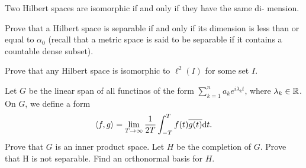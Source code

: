 \documentclass[11pt,a4paper]{article}
\begin{document}

\begin{exercise}
  Two Hilbert spaces are isomorphic if and only if they have the same di-
mension.
\end{exercise}
\begin{solution}

\end{solution}

\begin{exercise}
  Prove that a Hilbert space is separable if and only if its dimension is less
than or equal to $\alpha_0$
(recall that a metric space is said to be separable if it contains a countable
dense subset).
\end{exercise}
\begin{solution}

\end{solution}

\begin{exercise}
  Prove that any Hilbert space is isomorphic to $\ell^2(I)$ for some set $I$.
\end{exercise}
\begin{solution}

\end{solution}

\begin{exercise}
  Let $G$ be the linear span of all functinos of the form
  $\sum_{k=1}^{n} a_k e^{i \lambda_k t}$, where $\lambda_k \in \mathbb{R}$.
  On $G$, we define a form
  \[
    \left\langle f, g \right\rangle =
    \lim_{T \to \infty} \frac{1}{2T} \int_{-T}^{T} f(t) \overline{g(t)} \mathrm{d} t.
  \]
  Prove that $G$ is an inner product space.
  Let $H$ be the completion of $G$.
  Prove that H is not separable.
  Find an orthonormal basis for $H$.
\end{exercise}
\begin{solution}

\end{solution}
\end{document}
